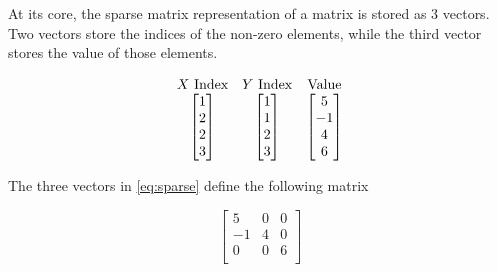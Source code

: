 \documentclass[authoryearcitations]{UoYCSproject}
\begin{document}
At its core, the sparse matrix representation of a matrix is stored as 3 vectors. Two vectors store the 
indices of the non-zero elements, while the third vector stores the value of those elements. 

\begin{equation}
\begin{array}{c c c}
X\text{ Index} & Y\text{ Index} & \text{Value} \\
\begin{bmatrix} 
                1 \\
                2 \\
                2 \\
                3 \\ \end{bmatrix} & \begin{bmatrix}          
                                           1 \\
                                           1 \\
                                           2 \\
                                           3 \\ \end{bmatrix} & \begin{bmatrix}
                                                                        5 \\
                                                                        -1 \\
                                                                         4 \\
                                                                          6 \\
                                                                \end{bmatrix}
\end{array}
\label{eq:sparse}
\end{equation}

The three vectors in \ref{eq:sparse} define the following matrix

\begin{equation}
\begin{bmatrix}
5   & 0  & 0 \\ 
-1  & 4  & 0 \\
 0  & 0  & 6 \\
\end{bmatrix}
\end{equation}
\end{document}
